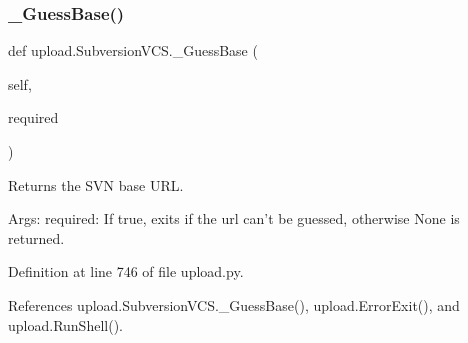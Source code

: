 \subsubsection{\texorpdfstring{\+\_\+\+Guess\+Base()}{\_GuessBase()}\hspace{0.1cm}{\footnotesize\ttfamily [2/2]}}
{\footnotesize\ttfamily def upload.\+Subversion\+V\+C\+S.\+\_\+\+Guess\+Base (\begin{DoxyParamCaption}\item[{}]{self,  }\item[{}]{required }\end{DoxyParamCaption})\hspace{0.3cm}{\ttfamily [private]}}

\begin{DoxyVerb}Returns the SVN base URL.

Args:
  required: If true, exits if the url can't be guessed, otherwise None is
returned.
\end{DoxyVerb}
 

Definition at line 746 of file upload.\+py.



References upload.\+Subversion\+V\+C\+S.\+\_\+\+Guess\+Base(), upload.\+Error\+Exit(), and upload.\+Run\+Shell().


